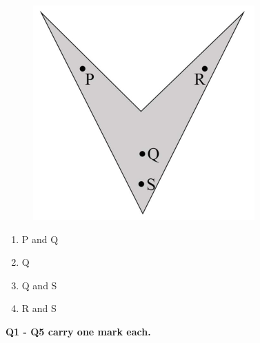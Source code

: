 \documentclass[12pt,a4paper]{article}
\begin{document}
\begin{enumerate}
         \begin{figure}[H]
            \centering
            \includegraphics[scale=0.7]{q5}
            \label{fig:q5}
         \end{figure}

         \begin{enumerate}
            \item P and Q
            \item Q
            \item Q and S
            \item R and S
         \end{enumerate}
\end{enumerate}
\normalsize\textbf{Q1 - Q5 carry one mark each.}
\end{document}
